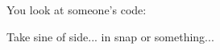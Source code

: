 \documentclass{ximera}
\author{Bart Snapp}
\begin{document}
\maketitle


\begin{exercise}
You look at someone's code:

Take sine of side... in snap or something... 
\end{exercise}
\end{document}
